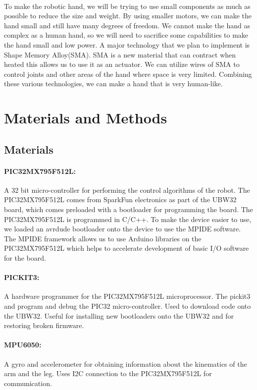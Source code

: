 \documentclass[letterpaper]{article}
\begin{document}
\paragraph{} To make the robotic hand, we will be trying to use small
components as much as possible to reduce the size and weight. By using smaller
motors, we can make the hand small and still have many degrees of freedom. We
cannot make the hand as complex as a human hand, so we will need to sacrifice
some capabilities to make the hand small and low power. A major technology that
we plan to implement is Shape Memory Alloy(SMA). SMA is a new material that can
contract when heated this allows us to use it as an actuator. We can utilize
wires of SMA to control joints and other areas of the hand where space is very
limited. Combining these various technologies, we can make a hand that is very
human-like.


\section{Materials and Methods}
\subsection{Materials}
\paragraph{PIC32MX795F512L:}A 32 bit micro-controller for performing the control
algorithms of the robot. The PIC32MX795F512L comes from SparkFun electronics as
part of the UBW32 board, which comes preloaded with a bootloader for programming
the board. The PIC32MX795F512L is programmed in C/C++. To make the device easier
to use, we loaded an avrdude bootloader onto the device to use the MPIDE
software. The MPIDE framework allows us to use Arduino libraries on the
PIC32MX795F512L which helps to accelerate development of basic I/O software for
the board\cite{pic32data}.

\paragraph{PICKIT3:}A hardware programmer for the PIC32MX795F512L
microprocessor. The pickit3 and program and debug the PIC32 micro-controller.
Used to download code onto the UBW32. Useful for installing new bootloaders onto
the UBW32 and for restoring broken firmware\cite{pickitdata}.

\paragraph{MPU6050:}A gyro and accelerometer for obtaining information about the
kinematics of the arm and the leg. Uses I2C connection to the PIC32MX795F512L
for communication\cite{mpu6050data}.
\end{document}
